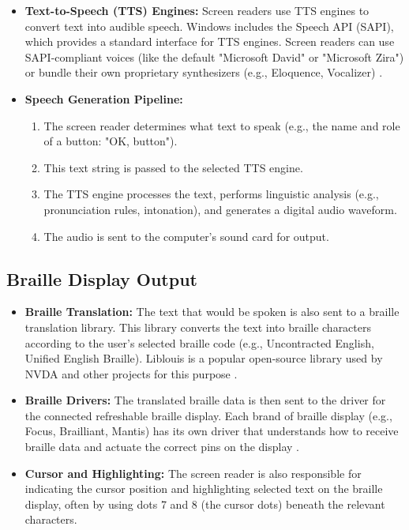 \begin{itemize}
	\item \textbf{Text-to-Speech (TTS) Engines:} Screen readers use TTS engines to convert text into audible speech. Windows includes the Speech API (SAPI), which provides a standard interface for TTS engines. Screen readers can use SAPI-compliant voices (like the default "Microsoft David" or "Microsoft Zira") or bundle their own proprietary synthesizers (e.g., Eloquence, Vocalizer) \cite{NVDASpeech, SuperNovaSpeech, JAWSFeatures}.
	\item \textbf{Speech Generation Pipeline:}
	      \begin{enumerate}
		      \item The screen reader determines what text to speak (e.g., the name and role of a button: "OK, button").
		      \item This text string is passed to the selected TTS engine.
		      \item The TTS engine processes the text, performs linguistic analysis (e.g., pronunciation rules, intonation), and generates a digital audio waveform.
		      \item The \gls{audio} is sent to the computer's sound card for output.
	      \end{enumerate}
\end{itemize}

\subsection{Braille Display Output}
\label{sub:braille-display-output}

\begin{itemize}
	\item \textbf{Braille Translation:} The text that would be spoken is also sent to a braille translation library. This library converts the text into braille characters according to the user's selected braille code (e.g., Uncontracted English, Unified English Braille). Liblouis is a popular open-source library used by NVDA and other projects for this purpose \cite{Liblouis, NVDABraille}.
	\item \textbf{Braille Drivers:} The translated braille data is then sent to the driver for the connected refreshable braille display. Each brand of braille display (e.g., Focus, Brailliant, Mantis) has its own driver that understands how to receive braille data and actuate the correct pins on the display \cite{FocusBlue, BrailliantBI40X, APHMantis, JAWSBraille, NarratorBraille}.
	\item \textbf{Cursor and Highlighting:} The screen reader is also responsible for indicating the cursor position and highlighting selected text on the braille display, often by using dots 7 and 8 (the cursor dots) beneath the relevant characters.
\end{itemize}

